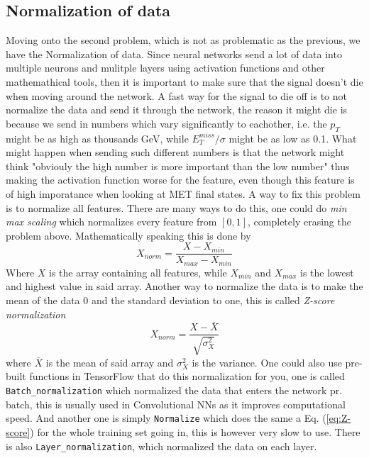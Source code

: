 \documentclass[14pt, a4paper]{book}
\begin{document}
\subsection{Normalization of data}\label{sec:normie_NN}
Moving onto the second problem, which is not as problematic as the previous, we have the Normalization of data. Since neural networks send a lot of data into multiple neurons and mulitple layers using activation functions and other mathemathical tools, then it is important to make sure that the signal doesn't die when moving around the network. A fast way for the signal to die off is to not normalize the data and send it through the network, the reason it might die is because we send in numbers which vary significantly to eachother, i.e. the $p_{T}$ might be as high as thousands GeV, while $E_T^{miss}/\sigma$ might be as low as 0.1. What might happen when sending such different numbers is that the network might think "obviouly the high number is more important than the low number" thus making the activation function worse for the feature, even though this feature is of high imporatance when looking at MET final states.
A way to fix this problem is to normalize all features. There are many ways to do this, one could do \textit{min max scaling} which normalizes every feature from $[0,1]$, completely erasing the problem above. Mathematically speaking this is done by
\begin{equation}\label{eq:minmax}
   X_{norm} = \frac{X - X_{min}}{X_{max}-X_{min}}
\end{equation}
Where $X$ is the array containing all features, while $X_{min}$ and $X_{max}$ is the lowest and highest value in said array. Another way to normalize the data is to make the mean of the data 0 and the standard deviation to one, this is called \textit{Z-score normalization} 
\begin{equation}\label{eq:Z-score}
   X_{norm} = \frac{X - \bar{X}}{\sqrt{\sigma_X^2}}
\end{equation}
where $\bar{X}$ is the mean of said array and $\sigma_X^2$ is the variance. One could also use pre-built functions in TensorFlow that do this normalization for you, one is called \verb|Batch_normalization| which normalized the data that enters the network pr. batch, this is usually used in Convolutional NNs as it improves computational speed. 
And another one is simply \verb|Normalize| which does the same a Eq. (\ref{eq:Z-score}) for the whole training set going in, this is however very slow to use. There is also \verb|Layer_normalization|, which normalized the data on each layer. \\
\end{document}
